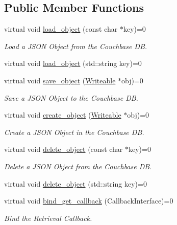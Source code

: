 \subsection*{Public Member Functions}
\begin{DoxyCompactItemize}
\item 
virtual void \hyperlink{classCouchbaseInterface_a62a765de48bfc92d748df829ca960ff2}{load\-\_\-object} (const char $\ast$key)=0
\begin{DoxyCompactList}\small\item\em Load a J\-S\-O\-N Object from the Couchbase D\-B. \end{DoxyCompactList}\item 
virtual void \hyperlink{classCouchbaseInterface_a1aee19796f864ff531cbb55f42764bf6}{load\-\_\-object} (std\-::string key)=0
\item 
virtual void \hyperlink{classCouchbaseInterface_ab4ea907f469d14323e451ffdccb213c2}{save\-\_\-object} (\hyperlink{classWriteable}{Writeable} $\ast$obj)=0
\begin{DoxyCompactList}\small\item\em Save a J\-S\-O\-N Object to the Couchbase D\-B. \end{DoxyCompactList}\item 
virtual void \hyperlink{classCouchbaseInterface_a7ac9545e6f7a45d24e8e41ccae1f6112}{create\-\_\-object} (\hyperlink{classWriteable}{Writeable} $\ast$obj)=0
\begin{DoxyCompactList}\small\item\em Create a J\-S\-O\-N Object in the Couchbase D\-B. \end{DoxyCompactList}\item 
virtual void \hyperlink{classCouchbaseInterface_a99ec66952f649bb84c80b20487e82839}{delete\-\_\-object} (const char $\ast$key)=0
\begin{DoxyCompactList}\small\item\em Delete a J\-S\-O\-N Object from the Couchbase D\-B. \end{DoxyCompactList}\item 
virtual void \hyperlink{classCouchbaseInterface_aa45552deeb14c1eafca33eaccb85e094}{delete\-\_\-object} (std\-::string key)=0
\item 
virtual void \hyperlink{classCouchbaseInterface_a88980b99dc329e5cd02f240ddbbba1ca}{bind\-\_\-get\-\_\-callback} (Callback\-Interface)=0
\begin{DoxyCompactList}\small\item\em Bind the Retrieval Callback. \end{DoxyCompactList}\item 

\end{DoxyCompactItemize}
